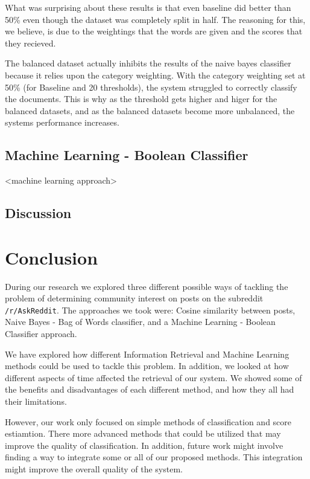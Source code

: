 \documentclass{acm_proc_article-sp}
\begin{document}
What was surprising about these results is that even baseline did better than 50\% even though the dataset was completely split in half. The reasoning for this, we believe, is due to the weightings that the words are given and the scores that they recieved. 

The balanced dataset actually inhibits the results of the naive bayes classifier because it relies upon the category weighting. With the category weighting set at 50\% (for Baseline and 20 thresholds), the system struggled to correctly classify the documents. This is why as the threshold gets higher and higer for the balanced datasets, and as the balanced datasets become more unbalanced, the systems performance increases.

\subsection{Machine Learning - Boolean Classifier}
<machine learning approach>

\subsection{Discussion}


\section{Conclusion}
During our research we explored three different possible ways of tackling the problem of determining community interest on posts on the subreddit \texttt{/r/AskReddit}. The approaches we took were: Cosine similarity between posts, Naive Bayes - Bag of Words classifier, and a Machine Learning - Boolean Classifier approach. 

We have explored how different Information Retrieval and Machine Learning methods could be used to tackle this problem. In addition, we looked at how different aspects of time affected the retrieval of our system. We showed some of the benefits and disadvantages of each different method, and how they all had their limitations.

However, our work only focused on simple methods of classification and score estiamtion. There more advanced methods that could be utilized that may improve the quality of classification. In addition, future work might involve finding a way to integrate some or all of our proposed methods. This integration might improve the overall quality of the system.
\end{document}

